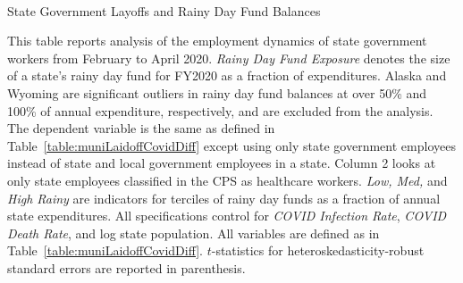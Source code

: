 \begin{singlespace}
\begin{table}
\begin{center}
\begin{threeparttable}

\caption{\\ State Government Layoffs and Rainy Day Fund Balances}
\label{table:layoffRainyDay}

\centering 

\begin{small}

	

\end{small}

\begin{footnotesize}
\begin{tablenotes}
\item This table reports analysis of the employment dynamics of state government workers from February to April 2020. \emph{Rainy Day Fund Exposure} denotes the size of a state's rainy day fund for FY2020 as a fraction of expenditures. Alaska and Wyoming are significant outliers in rainy day fund balances at over 50\% and 100\% of annual expenditure, respectively, and are excluded from the analysis. The dependent variable is the same as defined in Table~\ref{table:muniLaidoffCovidDiff} except using only state government employees instead of state and local government employees in a state. Column 2 looks at only state employees classified in the CPS as healthcare workers.  \emph{Low, Med,} and \emph{High Rainy} are indicators for terciles of rainy day funds as a fraction of annual state expenditures. All specifications control for \emph{COVID Infection Rate}, \emph{COVID Death Rate}, and log state population. All variables are defined as in Table~\ref{table:muniLaidoffCovidDiff}. $t$-statistics for heteroskedasticity-robust standard errors are reported in parenthesis. 
\end{tablenotes}
\end{footnotesize}

\end{threeparttable}
\end{center}
\end{table}
  
\end{singlespace}
\thispagestyle{empty}

